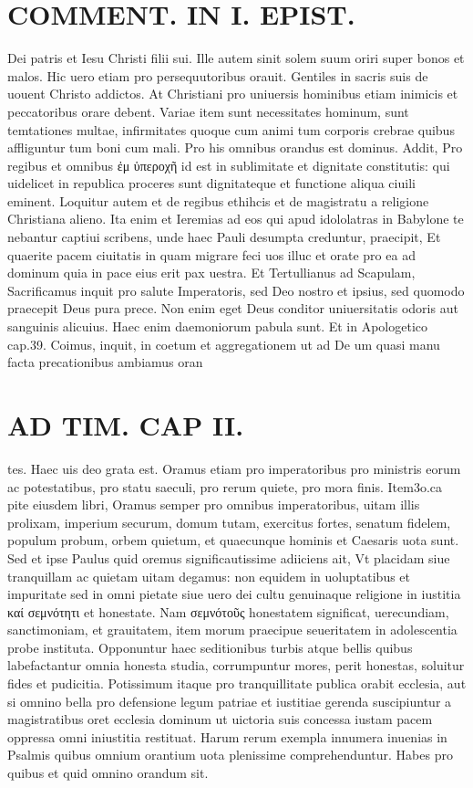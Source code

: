 \documentclass{article}
\begin{document}
\begin{pages}
\section*{COMMENT. IN I. EPIST. }\pstart Dei patris et Iesu Christi filii sui. Ille autem sinit solem suum oriri super bonos et malos. Hic uero etiam pro persequutoribus orauit. Gentiles in sacris suis de uouent Christo addictos. At Christiani pro uniuersis hominibus etiam inimicis et peccatoribus orare debent. Variae item sunt necessitates hominum, sunt temtationes multae, infirmitates quoque cum animi tum corporis crebrae quibus affliguntur tum boni cum mali. Pro his omnibus orandus est dominus. Addit, Pro regibus et omnibus ἐμ ὑπεροχῆ id est in sublimitate et dignitate constitutis: qui uidelicet in republica proceres sunt dignitateque et functione aliqua ciuili eminent. Loquitur autem et de regibus ethihcis et de magistratu a religione Christiana alieno. Ita enim et Ieremias ad eos qui apud idololatras in Babylone te nebantur captiui scribens, unde haec Pauli desumpta creduntur, praecipit, Et quaerite pacem ciuitatis in quam migrare feci uos illuc et orate pro ea ad dominum quia in pace eius erit pax uestra. Et Tertullianus ad Scapulam, Sacrificamus inquit pro salute Imperatoris, sed Deo nostro et ipsius, sed quomodo praecepit Deus pura prece. Non enim eget Deus conditor uniuersitatis odoris aut sanguinis alicuius. Haec enim daemoniorum pabula sunt. Et in Apologetico cap.39. Coimus, inquit, in coetum et aggregationem ut ad De um quasi manu facta precationibus ambiamus oran\pend
\section*{AD TIM. CAP II. }
\marginpar{[ p.112 ]}\pstart tes. Haec uis deo grata est. Oramus etiam pro imperatoribus pro ministris eorum ac potestatibus, pro statu saeculi, pro rerum quiete, pro mora finis. Item3o.ca pite eiusdem libri, Oramus semper pro omnibus imperatoribus, uitam illis prolixam, imperium securum, domum tutam, exercitus fortes, senatum fidelem, populum probum, orbem quietum, et quaecunque hominis et Caesaris uota sunt. Sed et ipse Paulus quid oremus significautissime adiiciens ait, Vt placidam siue tranquillam ac quietam uitam degamus: non equidem in uoluptatibus et impuritate sed in omni pietate siue uero dei cultu genuinaque religione in iustitia καί σεμνότητι et honestate. Nam σεμνότοῦς honestatem significat, uerecundiam, sanctimoniam, et grauitatem, item morum praecipue seueritatem in adolescentia probe instituta. Opponuntur haec seditionibus turbis atque bellis quibus labefactantur omnia honesta studia, corrumpuntur mores, perit honestas, soluitur fides et pudicitia. Potissimum itaque pro tranquillitate publica orabit ecclesia, aut si omnino bella pro defensione legum patriae et iustitiae gerenda suscipiuntur a magistratibus oret ecclesia dominum ut uictoria suis concessa iustam pacem oppressa omni iniustitia restituat. Harum rerum exempla innumera inuenias in Psalmis quibus omnium orantium uota plenissime comprehenduntur. Habes pro quibus et quid omnino orandum sit.  \pend

\end{pages}
\end{document}
